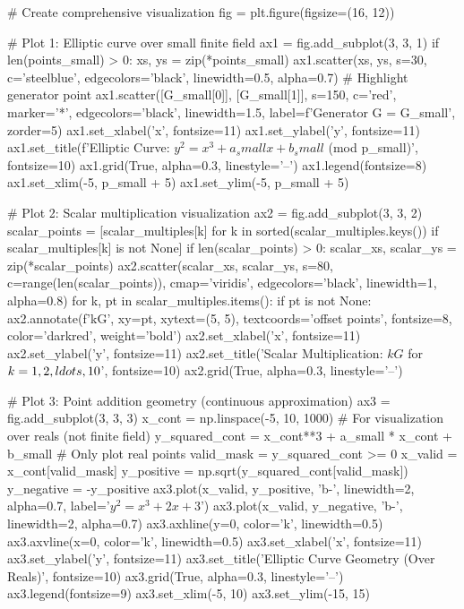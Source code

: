 \documentclass[a4paper, 11pt]{article}
\begin{document}
\begin{pycode}
# Create comprehensive visualization
fig = plt.figure(figsize=(16, 12))

# Plot 1: Elliptic curve over small finite field
ax1 = fig.add_subplot(3, 3, 1)
if len(points_small) > 0:
    xs, ys = zip(*points_small)
    ax1.scatter(xs, ys, s=30, c='steelblue', edgecolors='black', linewidth=0.5, alpha=0.7)
    # Highlight generator point
    ax1.scatter([G_small[0]], [G_small[1]], s=150, c='red', marker='*',
                edgecolors='black', linewidth=1.5, label=f'Generator G = {G_small}', zorder=5)
    ax1.set_xlabel('x', fontsize=11)
    ax1.set_ylabel('y', fontsize=11)
    ax1.set_title(f'Elliptic Curve: $y^2 = x^3 + {a_small}x + {b_small}$ (mod {p_small})', fontsize=10)
    ax1.grid(True, alpha=0.3, linestyle='--')
    ax1.legend(fontsize=8)
    ax1.set_xlim(-5, p_small + 5)
    ax1.set_ylim(-5, p_small + 5)

# Plot 2: Scalar multiplication visualization
ax2 = fig.add_subplot(3, 3, 2)
scalar_points = [scalar_multiples[k] for k in sorted(scalar_multiples.keys()) if scalar_multiples[k] is not None]
if len(scalar_points) > 0:
    scalar_xs, scalar_ys = zip(*scalar_points)
    ax2.scatter(scalar_xs, scalar_ys, s=80, c=range(len(scalar_points)),
                cmap='viridis', edgecolors='black', linewidth=1, alpha=0.8)
    for k, pt in scalar_multiples.items():
        if pt is not None:
            ax2.annotate(f'{k}G', xy=pt, xytext=(5, 5), textcoords='offset points',
                        fontsize=8, color='darkred', weight='bold')
    ax2.set_xlabel('x', fontsize=11)
    ax2.set_ylabel('y', fontsize=11)
    ax2.set_title('Scalar Multiplication: $kG$ for $k = 1, 2, \\ldots, 10$', fontsize=10)
    ax2.grid(True, alpha=0.3, linestyle='--')

# Plot 3: Point addition geometry (continuous approximation)
ax3 = fig.add_subplot(3, 3, 3)
x_cont = np.linspace(-5, 10, 1000)
# For visualization over reals (not finite field)
y_squared_cont = x_cont**3 + a_small * x_cont + b_small
# Only plot real points
valid_mask = y_squared_cont >= 0
x_valid = x_cont[valid_mask]
y_positive = np.sqrt(y_squared_cont[valid_mask])
y_negative = -y_positive
ax3.plot(x_valid, y_positive, 'b-', linewidth=2, alpha=0.7, label='$y^2 = x^3 + 2x + 3$')
ax3.plot(x_valid, y_negative, 'b-', linewidth=2, alpha=0.7)
ax3.axhline(y=0, color='k', linewidth=0.5)
ax3.axvline(x=0, color='k', linewidth=0.5)
ax3.set_xlabel('x', fontsize=11)
ax3.set_ylabel('y', fontsize=11)
ax3.set_title('Elliptic Curve Geometry (Over Reals)', fontsize=10)
ax3.grid(True, alpha=0.3, linestyle='--')
ax3.legend(fontsize=9)
ax3.set_xlim(-5, 10)
ax3.set_ylim(-15, 15)


\end{pycode}
\end{document}
